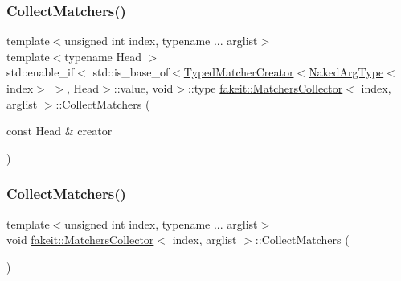 \mbox{\label{classfakeit_1_1MatchersCollector_ae954aa74286bcd096169067f5e897356}} 
\subsubsection{\texorpdfstring{CollectMatchers()}{CollectMatchers()}\hspace{0.1cm}{\footnotesize\ttfamily [53/63]}}
{\footnotesize\ttfamily template$<$unsigned int index, typename ... arglist$>$ \\
template$<$typename Head $>$ \\
std\+::enable\+\_\+if$<$ std\+::is\+\_\+base\+\_\+of$<$\mbox{\hyperlink{structfakeit_1_1TypedMatcherCreator}{Typed\+Matcher\+Creator}}$<$\mbox{\hyperlink{classfakeit_1_1MatchersCollector_aeda8ced6a2f0cb7c6e4f916f18a91730}{Naked\+Arg\+Type}}$<$index$>$ $>$, Head$>$\+::value, void$>$\+::type \mbox{\hyperlink{classfakeit_1_1MatchersCollector}{fakeit\+::\+Matchers\+Collector}}$<$ index, arglist $>$\+::Collect\+Matchers (\begin{DoxyParamCaption}\item[{const Head \&}]{creator }\end{DoxyParamCaption})\hspace{0.3cm}{\ttfamily [inline]}}

\mbox{\label{classfakeit_1_1MatchersCollector_a2d9a08a347c3915daa33f307a274f13c}} 
\subsubsection{\texorpdfstring{CollectMatchers()}{CollectMatchers()}\hspace{0.1cm}{\footnotesize\ttfamily [54/63]}}
{\footnotesize\ttfamily template$<$unsigned int index, typename ... arglist$>$ \\
void \mbox{\hyperlink{classfakeit_1_1MatchersCollector}{fakeit\+::\+Matchers\+Collector}}$<$ index, arglist $>$\+::Collect\+Matchers (\begin{DoxyParamCaption}{ }\end{DoxyParamCaption})\hspace{0.3cm}{\ttfamily [inline]}}

